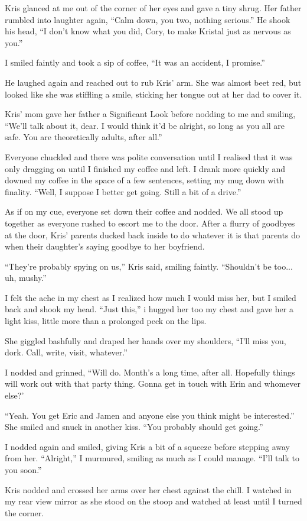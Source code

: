 Kris glanced at me out of the corner of her eyes and gave a tiny shrug.  Her father rumbled into laughter again, ``Calm down, you two, nothing serious.''  He shook his head, ``I don't know what you did, Cory, to make Kristal just as nervous as you.''

I smiled faintly and took a sip of coffee, ``It was an accident, I promise.''

He laughed again and reached out to rub Kris' arm.  She was almost beet red, but looked like she was stiffling a smile, sticking her tongue out at her dad to cover it.

Kris' mom gave her father a Significant Look before nodding to me and smiling, ``We'll talk about it, dear.  I would think it'd be alright, so long as you all are safe.  You are theoretically adults, after all.''

Everyone chuckled and there was polite conversation until I realised that it was only dragging on until I finished my coffee and left.  I drank more quickly and downed my coffee in the space of a few sentences, setting my mug down with finality.  ``Well, I suppose I better get going.  Still a bit of a drive.''

As if on my cue, everyone set down their coffee and nodded.  We all stood up together as everyone rushed to escort me to the door.  After a flurry of goodbyes at the door, Kris' parents ducked back inside to do whatever it is that parents do when their daughter's saying goodbye to her boyfriend.

``They're probably spying on us,'' Kris said, smiling faintly.  ``Shouldn't be too... uh, mushy.''

I felt the ache in my chest as I realized how much I would miss her, but I smiled back and shook my head.  ``Just this,'' i hugged her too my chest and gave her a light kiss, little more than a prolonged peck on the lips.

She giggled bashfully and draped her hands over my shoulders, ``I'll miss you, dork.  Call, write, visit, whatever.''

I nodded and grinned, ``Will do.  Month's a long time, after all.  Hopefully things will work out with that party thing.  Gonna get in touch with Erin and whomever else?'

``Yeah.  You get Eric and Jamen and anyone else you think might be interested.''  She smiled and snuck in another kiss.  ``You probably should get going.''

I nodded again and smiled, giving Kris a bit of a squeeze before stepping away from her.  ``Alright,'' I murmured, smiling as much as I could manage.  ``I'll talk to you soon.''

Kris nodded and crossed her arms over her chest against the chill.  I watched in my rear view mirror as she stood on the stoop and watched at least until I turned the corner.

